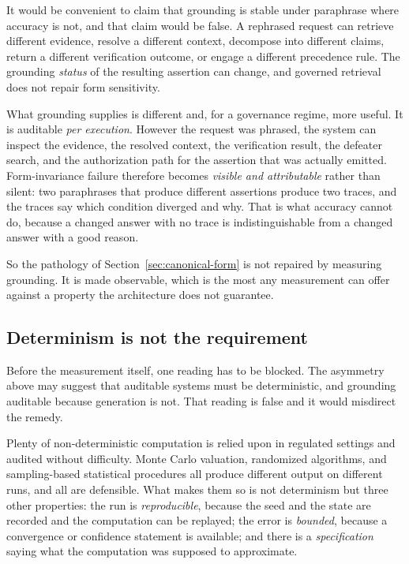 It would be convenient to claim that grounding is stable under paraphrase where
accuracy is not, and that claim would be false. A rephrased request can retrieve
different evidence, resolve a different context, decompose into different claims, return a
different verification outcome, or engage a different precedence rule. The grounding
\emph{status} of the resulting assertion can change, and governed retrieval does not
repair form sensitivity.

What grounding supplies is different and, for a governance regime, more useful. It is
auditable \emph{per execution}. However the request was phrased, the system can inspect
the evidence, the resolved context, the verification result, the defeater search, and the
authorization path for the assertion that was actually emitted. Form-invariance failure
therefore becomes \emph{visible and attributable} rather than silent: two paraphrases that
produce different assertions produce two traces, and the traces say which condition
diverged and why. That is what accuracy cannot do, because a changed answer with no trace
is indistinguishable from a changed answer with a good reason.

So the pathology of Section~\ref{sec:canonical-form} is not repaired by measuring
grounding. It is made observable, which is the most any measurement can offer against a
property the architecture does not guarantee.

\subsection{Determinism is not the requirement}
\label{sec:determinism}

Before the measurement itself, one reading has to be blocked. The asymmetry above may
suggest that auditable systems must be deterministic, and grounding auditable because
generation is not. That reading is false and it would misdirect the remedy.

Plenty of non-deterministic computation is relied upon in regulated settings and
audited without difficulty. Monte Carlo valuation, randomized algorithms, and
sampling-based statistical procedures all produce different output on different
runs, and all are defensible. What makes them so is not determinism but three other
properties: the run is \emph{reproducible}, because the seed and the state are
recorded and the computation can be replayed; the error is \emph{bounded}, because a
convergence or confidence statement is available; and there is a
\emph{specification} saying what the computation was supposed to approximate.


